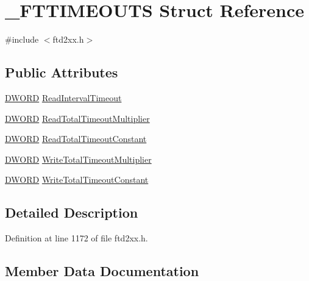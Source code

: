 \hypertarget{struct__FTTIMEOUTS}{}\section{\+\_\+\+F\+T\+T\+I\+M\+E\+O\+U\+TS Struct Reference}
\label{struct__FTTIMEOUTS}


{\ttfamily \#include $<$ftd2xx.\+h$>$}

\subsection*{Public Attributes}
\begin{DoxyCompactItemize}
\item 
\hyperlink{CatCaloProto40MHz_2inc_2WinTypes_8h_ad342ac907eb044443153a22f964bf0af}{D\+W\+O\+RD} \hyperlink{struct__FTTIMEOUTS_a0f9592f9863a3230933833750b67d467}{Read\+Interval\+Timeout}
\item 
\hyperlink{CatCaloProto40MHz_2inc_2WinTypes_8h_ad342ac907eb044443153a22f964bf0af}{D\+W\+O\+RD} \hyperlink{struct__FTTIMEOUTS_abec01499b73ce0bd194ca0628dbf58e8}{Read\+Total\+Timeout\+Multiplier}
\item 
\hyperlink{CatCaloProto40MHz_2inc_2WinTypes_8h_ad342ac907eb044443153a22f964bf0af}{D\+W\+O\+RD} \hyperlink{struct__FTTIMEOUTS_aa6478849c632565b01f91faca975cabe}{Read\+Total\+Timeout\+Constant}
\item 
\hyperlink{CatCaloProto40MHz_2inc_2WinTypes_8h_ad342ac907eb044443153a22f964bf0af}{D\+W\+O\+RD} \hyperlink{struct__FTTIMEOUTS_a1944986d4b6760a45db8ce1b58fa3688}{Write\+Total\+Timeout\+Multiplier}
\item 
\hyperlink{CatCaloProto40MHz_2inc_2WinTypes_8h_ad342ac907eb044443153a22f964bf0af}{D\+W\+O\+RD} \hyperlink{struct__FTTIMEOUTS_ac36dfafaf9522e0b041080242538d196}{Write\+Total\+Timeout\+Constant}
\end{DoxyCompactItemize}


\subsection{Detailed Description}


Definition at line 1172 of file ftd2xx.\+h.



\subsection{Member Data Documentation}
\mbox{\label{struct__FTTIMEOUTS_a0f9592f9863a3230933833750b67d467}} 
